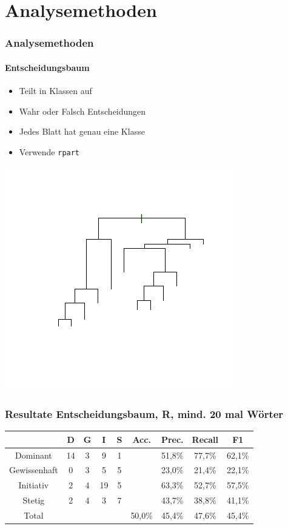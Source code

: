 \documentclass{beamer}
\begin{document}
 \section{Analysemethoden}
\begin{frame}
\frametitle{Analysemethoden}
\framesubtitle{Entscheidungsbaum}
\begin{itemize}\setlength\parskip{12pt}
\item Teilt in Klassen auf
\item Wahr oder Falsch Entscheidungen
\item Jedes Blatt hat genau eine Klasse
\item Verwende \texttt{rpart}
\end{itemize}
\begin{center}
	\includegraphics[scale=0.5]{RPart.png}
\end{center}
\end{frame}
\begin{frame}
\frametitle{Resultate Entscheidungsbaum, R, mind. 20 mal Wörter}
\begin{center}
\begin{tabular}{|c|c|c|c|c|c|c|c|c|}
\hline
 &  D 	& G	& I & S	& Acc.	& Prec. & Recall	& F1\\
\hline
Dominant & 14 & 3 & 9 & 1 & & 51,8\% & 77,7\% & 62,1\% \\
Gewissenhaft & 0 & 3 & 5 & 5& &23,0\% & 21,4\% & 22,1\%\\
Initiativ & 2 & 4 & 19 & 5& &63,3\% & 52,7\% & 57,5\%\\
Stetig & 2 & 4 & 3 & 7& &43,7\% & 38,8\% & 41,1\% \\
\hline
Total 	&		&		& & 		& 50,0\%	& 45,4\% & 47,6\% & 45,4\%\\
\hline
\end{tabular}
\end{center}
\end{frame}
\end{document}
